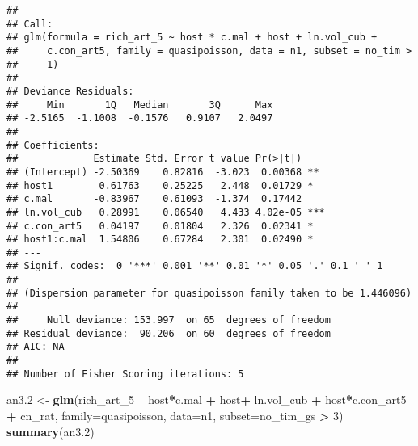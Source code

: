 \documentclass[]{article}
\newenvironment{Shaded}{\begin{snugshade}}{\end{snugshade}}
\newcommand{\KeywordTok}[1]{\textcolor[rgb]{0.13,0.29,0.53}{\textbf{#1}}}
\newcommand{\DataTypeTok}[1]{\textcolor[rgb]{0.13,0.29,0.53}{#1}}
\newcommand{\DecValTok}[1]{\textcolor[rgb]{0.00,0.00,0.81}{#1}}
\newcommand{\StringTok}[1]{\textcolor[rgb]{0.31,0.60,0.02}{#1}}
\newcommand{\OperatorTok}[1]{\textcolor[rgb]{0.81,0.36,0.00}{\textbf{#1}}}
\newcommand{\NormalTok}[1]{#1}
\begin{document}
\begin{verbatim}
## 
## Call:
## glm(formula = rich_art_5 ~ host * c.mal + host + ln.vol_cub + 
##     c.con_art5, family = quasipoisson, data = n1, subset = no_tim > 
##     1)
## 
## Deviance Residuals: 
##     Min       1Q   Median       3Q      Max  
## -2.5165  -1.1008  -0.1576   0.9107   2.0497  
## 
## Coefficients:
##             Estimate Std. Error t value Pr(>|t|)    
## (Intercept) -2.50369    0.82816  -3.023  0.00368 ** 
## host1        0.61763    0.25225   2.448  0.01729 *  
## c.mal       -0.83967    0.61093  -1.374  0.17442    
## ln.vol_cub   0.28991    0.06540   4.433 4.02e-05 ***
## c.con_art5   0.04197    0.01804   2.326  0.02341 *  
## host1:c.mal  1.54806    0.67284   2.301  0.02490 *  
## ---
## Signif. codes:  0 '***' 0.001 '**' 0.01 '*' 0.05 '.' 0.1 ' ' 1
## 
## (Dispersion parameter for quasipoisson family taken to be 1.446096)
## 
##     Null deviance: 153.997  on 65  degrees of freedom
## Residual deviance:  90.206  on 60  degrees of freedom
## AIC: NA
## 
## Number of Fisher Scoring iterations: 5
\end{verbatim}

\begin{Shaded}
\begin{Highlighting}[]
\NormalTok{an3.}\DecValTok{2}\NormalTok{ <-}\StringTok{ }\KeywordTok{glm}\NormalTok{(rich_art_}\DecValTok{5} \OperatorTok{~}\StringTok{ }\NormalTok{host}\OperatorTok{*}\NormalTok{c.mal }\OperatorTok{+}\StringTok{ }\NormalTok{host}\OperatorTok{+}\StringTok{ }\NormalTok{ln.vol_cub }\OperatorTok{+}\StringTok{ }\NormalTok{host}\OperatorTok{*}\NormalTok{c.con_art5 }\OperatorTok{+}
\StringTok{               }\NormalTok{cn_rat, }
           \DataTypeTok{family=}\NormalTok{quasipoisson, }\DataTypeTok{data=}\NormalTok{n1, }\DataTypeTok{subset=}\NormalTok{no_tim_gs }\OperatorTok{>}\StringTok{ }\DecValTok{3}\NormalTok{)}
\KeywordTok{summary}\NormalTok{(an3.}\DecValTok{2}\NormalTok{)}
\end{Highlighting}
\end{Shaded}
\end{document}
